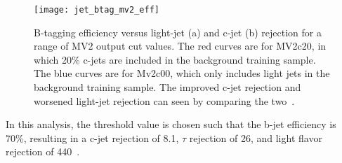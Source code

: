 \begin{figure}[!ht]
    \centering
\texttt{[image: jet\_btag\_mv2\_eff]}
\caption{B-tagging efficiency versus light-jet (a) and c-jet (b) rejection for a range of MV2 output cut values.
The red curves are for MV2c20, in which 20\% c-jets are included in the background training sample.
The blue curves are for Mv2c00, which only includes light jets in the background training sample.
The improved c-jet rejection and worsened light-jet rejection can seen by comparing the two~\cite{jet-btag-mv2}.}
\label{fig:jet_btag_mv2_eff}
\end{figure}

In this analysis, the threshold value is chosen such that the b-jet efficiency is 70\%, resulting in a c-jet rejection of 8.1, $\tau$ rejection of 26, and light flavor rejection of 440~\cite{jet-btag-mv2}.